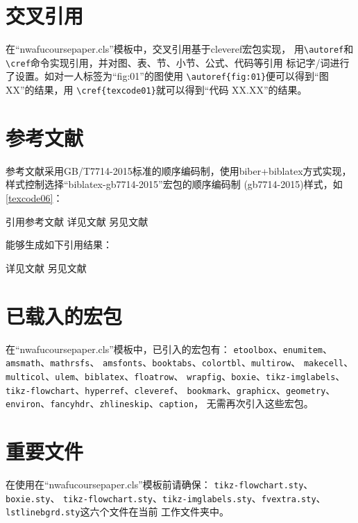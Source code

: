 \documentclass{nwafucoursepaper}
\begin{document}
\section{交叉引用}
在\enquote{nwafucoursepaper.cls}模板中，交叉引用基于cleveref宏包实现，
用\verb|\autoref|和\verb|\cref|命令实现引用，并对图、表、节、小节、公式、代码等引用
标记字/词进行了设置。如对一人标签为\enquote{fig:01}的图使用
\verb|\autoref{fig:01}|便可以得到\enquote{图 XX}的结果，用
\verb|\cref{texcode01}|就可以得到\enquote{代码 XX.XX}的结果。

\section{参考文献}
参考文献采用GB/T7714-2015标准的顺序编码制，使用biber+biblatex方式实现，
样式控制选择\enquote{biblatex-gb7714-2015}宏包的顺序编码制
(gb7714-2015)样式，如\cref{texcode06}：

\begin{center}
  \begin{langCVOne}[tex][texcode06][\LaTeX{}]{引用参考文献}
    详见文献\cite{Peebles2001-100-100}\parencite{Babu2014--}
    另见文献\cite[49]{于潇2012-1518-1523}\parencite[106]{Babu2014--}
  \end{langCVOne}
\end{center}

能够生成如下引用结果：

详见文献\cite{Peebles2001-100-100}\parencite{Babu2014--}
另见文献\cite[49]{于潇2012-1518-1523}\parencite[106]{Babu2014--}

\section{已载入的宏包}
在\enquote{nwafucoursepaper.cls}模板中，已引入的宏包有：
\verb|etoolbox|、\verb|enumitem|、\verb|amsmath|、\verb|mathrsfs|、
\verb|amsfonts|、\verb|booktabs|、\verb|colortbl|、\verb|multirow|、
\verb|makecell|、\verb|multicol|、\verb|ulem|、\verb|biblatex|、\verb|floatrow|、
\verb|wrapfig|、\verb|boxie|、\verb|tikz-imglabels|、
\verb|tikz-flowchart|、\verb|hyperref|、\verb|cleveref|、
\verb|bookmark|、\verb|graphicx|、\verb|geometry|、
\verb|environ|、\verb|fancyhdr|、\verb|zhlineskip|、\verb|caption|，
无需再次引入这些宏包。

\section{重要文件}
\begin{importantBox}
  在使用在\enquote{nwafucoursepaper.cls}模板前请确保：
  \verb|tikz-flowchart.sty|、\verb|boxie.sty|、
  \verb|tikz-flowchart.sty|、\verb|tikz-imglabels.sty|、\verb|fvextra.sty|、\verb|lstlinebgrd.sty|这六个文件在当前
  工作文件夹中。
\end{importantBox}

\printbibliography[heading=bibliography,title=参考文献]
\end{document}
